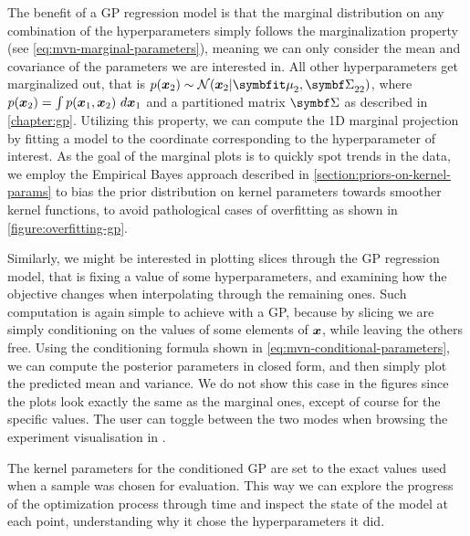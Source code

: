 The benefit of a GP regression model is that the marginal distribution on any combination of the hyperparameters simply follows the marginalization property (see \autoref{eq:mvn-marginal-parameters}), meaning we can only consider the mean and covariance of the parameters we are interested in. All other hyperparameters get marginalized out, that is $p(\vx_2) \sim \mathcal{N}(\vx_2 | \vmu_2, \mSigma_{22})$, where $p({\boldsymbol{x}}_2) = \int p({\boldsymbol{x}}_1, {\boldsymbol{x}}_2)\ d{\boldsymbol{x}}_1$ and a partitioned matrix $\mSigma$ as described in \autoref{chapter:gp}. Utilizing this property, we can compute the 1D marginal projection by fitting a model to the coordinate corresponding to the hyperparameter of interest. As the goal of the marginal plots is to quickly spot trends in the data, we employ the Empirical Bayes approach described in \autoref{section:priors-on-kernel-params} to bias the prior distribution on kernel parameters towards smoother kernel functions, to avoid pathological cases of overfitting as shown in \autoref{figure:overfitting-gp}.

Similarly, we might be interested in plotting slices through the GP regression model, that is fixing a value of some hyperparameters, and examining how the objective changes when interpolating through the remaining ones. Such computation is again simple to achieve with a GP, because by slicing we are simply conditioning on the values of some elements of ${\boldsymbol{x}}$, while leaving the others free. Using the conditioning formula shown in \autoref{eq:mvn-conditional-parameters}, we can compute the posterior parameters in closed form, and then simply plot the predicted mean and variance. We do not show this case in the figures since the plots look exactly the same as the marginal ones, except of course for the specific values. The user can toggle between the two modes when browsing the experiment visualisation in \bopt.

The kernel parameters for the conditioned GP are set to the exact values used when a sample was chosen for evaluation. This way we can explore the progress of the optimization process through time and inspect the state of the model at each point, understanding why it chose the hyperparameters it did.

